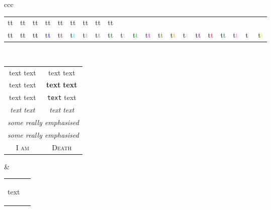 \documentclass[fleqn,a4paper,11pt]{article}
\begin{document}
\begin{center}
\begin{longtable}{ccc}
{\begin{tabular}{ccccccccccccccccccccc}
{\color{Wheat3} t}\textcolor{Wheat3}{t} &
{\color{Wheat4} t}\textcolor{Wheat4}{t} &
{\color{Yellow1} t}\textcolor{Yellow1}{t} &
{\color{Yellow2} t}\textcolor{Yellow2}{t} &
{\color{Yellow3} t}\textcolor{Yellow3}{t} &
{\color{Yellow4} t}\textcolor{Yellow4}{t} &
{\color{Gray0} t}\textcolor{Gray0}{t} &
{\color{Green0} t}\textcolor{Green0}{t} &
{\color{Grey0} t}\textcolor{Grey0}{t} \\
{\color{Maroon0} t}\textcolor{Maroon0}{t} &
{\color{Purple0} t}\textcolor{Purple0}{t} &
{\color{black} t}\textcolor{black}{t} &
{\color{blue} t}\textcolor{blue}{t} &
{\color{brown} t}\textcolor{brown}{t} &
{\color{cyan} t}\textcolor{cyan}{t} &
{\color{darkgray} t}\textcolor{darkgray}{t} &
{\color{gray} t}\textcolor{gray}{t} &
{\color{green} t}\textcolor{green}{t} &
{\color{lightgray} t}\textcolor{lightgray}{t} &
{\color{lime} t}\textcolor{lime}{t} &
{\color{magenta} t}\textcolor{magenta}{t} &
{\color{olive} t}\textcolor{olive}{t} &
{\color{orange} t}\textcolor{orange}{t} &
{\color{pink} t}\textcolor{pink}{t} &
{\color{purple} t}\textcolor{purple}{t} &
{\color{red} t}\textcolor{red}{t} &
{\color{teal} t}\textcolor{teal}{t} &
{\color{violet} t}\textcolor{violet}{t} &
{\color{white} t}\textcolor{white}{t} &
{\color{yellow} t}\textcolor{yellow}{t} \\
\end{tabular}} \\
    \begin{tabular}{cc}
    \textmd{text} {\mdseries text} & %
    \textrm{text} {\rmfamily text} \\ %
    \textup{text} {\upshape text} & %
    \textbf{text} {\bfseries text} \\ %
    \textsf{text} {\sffamily text} & %
    \texttt{text} {\ttfamily text} \\ %
    \textit{text} {\itshape text} & %
    \textsl{text} {\slshape text} \\ %
    \multicolumn{2}{c}{\emph{some \emph{really} emphasised}} \\ %
    \multicolumn{2}{c}{\em some {\em really} emphasised} \\ %
    \textsc{I am} & {\scshape Death} \\ %
    \end{tabular} &
    \begin{tabular}{cc}
    \begin{tiny}text\end{tiny} &

\end{tabular}
\end{longtable}
\end{center}
\end{document}
